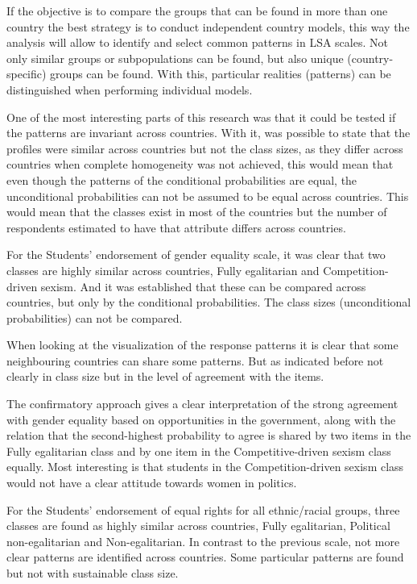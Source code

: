 \documentclass[12pt,a4paper,oneside]{reedthesis}
\begin{document}
If the objective is to compare the groups that can be found in more than one country the best strategy is to conduct independent country models, this way the analysis will allow to identify and select common patterns in LSA scales. Not only similar groups or subpopulations can be found, but also unique (country-specific) groups can be found. With this, particular realities (patterns) can be distinguished when performing individual models.

One of the most interesting parts of this research was that it could be tested if the patterns are invariant across countries. With it, was possible to state that the profiles were similar across countries but not the class sizes, as they differ across countries when complete homogeneity was not achieved, this would mean that even though the patterns of the conditional probabilities are equal, the unconditional probabilities can not be assumed to be equal across countries. This would mean that the classes exist in most of the countries but the number of respondents estimated to have that attribute differs across countries.

For the Students' endorsement of gender equality scale, it was clear that two classes are highly similar across countries, Fully egalitarian and Competition-driven sexism. And it was established that these can be compared across countries, but only by the conditional probabilities. The class sizes (unconditional probabilities) can not be compared.

When looking at the visualization of the response patterns it is clear that some neighbouring countries can share some patterns. But as indicated before not clearly in class size but in the level of agreement with the items.

The confirmatory approach gives a clear interpretation of the strong agreement with gender equality based on opportunities in the government, along with the relation that the second-highest probability to agree is shared by two items in the Fully egalitarian class and by one item in the Competitive-driven sexism class equally. Most interesting is that students in the Competition-driven sexism class would not have a clear attitude towards women in politics.

For the Students' endorsement of equal rights for all ethnic/racial groups, three classes are found as highly similar across countries, Fully egalitarian, Political non-egalitarian and Non-egalitarian. In contrast to the previous scale, not more clear patterns are identified across countries. Some particular patterns are found but not with sustainable class size.
\end{document}

